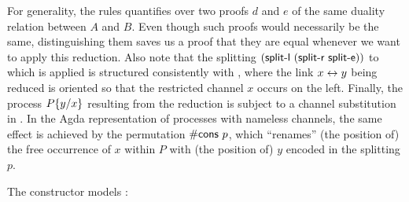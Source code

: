 \begin{AgdaAlign}
For generality, the rules quantifies over two proofs $d$ and $e$ of the same
duality relation between $A$ and $B$. Even though such proofs would necessarily
be the same, distinguishing them saves us a proof that they are equal whenever
we want to apply this reduction. 
%
Also note that the splitting
$(\AgdaInductiveConstructor{split-l}~(\AgdaInductiveConstructor{split-r}~\AgdaInductiveConstructor{split-e}))$
to which  is applied is structured consistently
with , where the link $x\leftrightarrow y$ being reduced is oriented
so that the restricted channel $x$ occurs on the left. 
%
Finally, the process $P\{y/x\}$ resulting from the reduction is subject to a
channel substitution in . In the Agda representation of
processes with nameless channels, the same effect is achieved by the permutation
$\AgdaFunction{\#cons}~p$, which ``renames'' (the position of) the free
occurrence of $x$ within $P$ with (the position of) $y$ encoded in the splitting
$p$.

The constructor  models \RClose:

\begin{code}%
%
\>[2]%
\>[14]\AgdaSymbol{:}%
\>[277I]\AgdaSpace{}%
\AgdaSymbol{:}\AgdaSpace{}%
\AgdaSpace{}%
\AgdaSymbol{\}}\AgdaSpace{}%
\AgdaSymbol{(}\AgdaSpace{}%
\AgdaSymbol{:}\AgdaSpace{}%
\AgdaSpace{}%
\AgdaSpace{}%
\AgdaInductiveConstructor{[]}\AgdaSpace{}%
\AgdaOperator{\AgdaDatatype{+}}\AgdaSpace{}%
\AgdaSymbol{)}\AgdaSpace{}%
\AgdaSymbol{(}\AgdaSpace{}%
\AgdaSymbol{:}\AgdaSpace{}%
\AgdaSpace{}%
\AgdaSpace{}%
\AgdaInductiveConstructor{[]}\AgdaSpace{}%
\AgdaOperator{\AgdaDatatype{+}}\AgdaSpace{}%
\AgdaSymbol{)}\AgdaSpace{}%
\<%
\\
\>[.][@{}l@{}]\<[277I]%
\>[16]\AgdaSpace{}%
\AgdaSpace{}%
\AgdaSpace{}%
\AgdaSpace{}%
\AgdaSymbol{(}\AgdaSpace{}%
\AgdaSymbol{(}\AgdaSpace{}%
\AgdaSymbol{)}\AgdaSpace{}%
\AgdaSymbol{)}\AgdaSpace{}%
\AgdaSpace{}%
\<%
\end{code}


\end{AgdaAlign}

